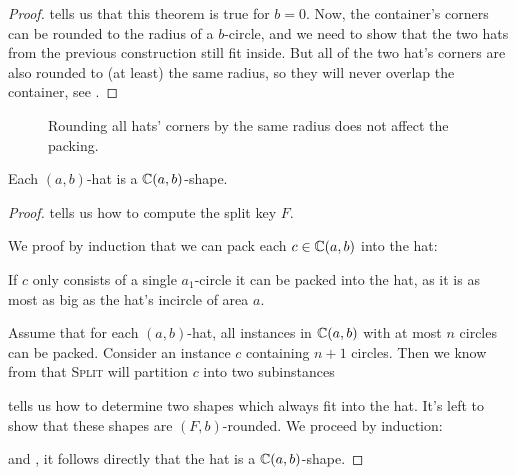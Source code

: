 \documentclass[%
    a4paper,              %
    style=screen,          %
    bibliography=totoc,   %
    nexus,                %
    lnum,                 %
    extramargin,          %
]{tubsbook}
\newcommand\defaulta{30}
\newcommand\defaultb{40}
\newcommand\defaultr{0.2}
\newcommand\defaultx{0.6}
\begin{document}
\begin{proof}
     tells us that this theorem is true for $b = 0$. Now, the container's corners can be rounded to the radius of a $b$-circle, and we need to show that the two hats from the previous construction still fit inside. But all of the two hat's corners are also rounded to (at least) the same radius, so they will never overlap the container, see .
\end{proof}

\begin{figure}[htbp!]
    \centering


    \caption{Rounding all hats' corners by the same radius does not affect the packing.}
    \label{fig:rounding-hats}
\end{figure}

\begin{theorem}
    Each $(a,b)$-hat is a $\mathbb{C}(a,b)$-shape.
\end{theorem}

\begin{proof}
     tells us how to compute the split key $F$.

    We proof by induction that we can pack each $c \in \mathbb{C}(a,b)$ into the hat:

    If $c$ only consists of a single $a_1$-circle it can be packed into the hat, as it is as most as big as the hat's incircle of area $a$.

    Assume that for each $(a,b)$-hat, all instances in $\mathbb{C}(a,b)$ with at most $n$ circles can be packed. Consider an instance $c$ containing $n+1$ circles. Then we know from  that \textsc{Split} will partition $c$ into two subinstances

     tells us how to determine two shapes which always fit into the hat. It's left to show that these shapes are $(F,b)$-rounded. We proceed by induction:

    and , it follows directly that the hat is a $\mathbb{C}(a,b)$-shape.
\end{proof}
\end{document}
